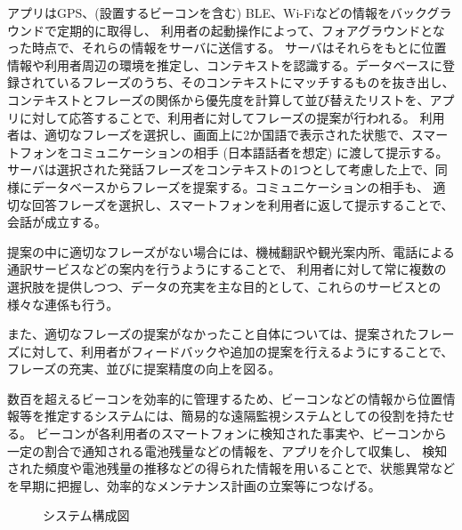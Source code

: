 \documentclass[openany,11pt,papersize]{jsbook}
\begin{document}
アプリはGPS、(設置するビーコンを含む) BLE、Wi-Fiなどの情報をバックグラウンドで定期的に取得し、
利用者の起動操作によって、フォアグラウンドとなった時点で、それらの情報をサーバに送信する。
サーバはそれらをもとに位置情報や利用者周辺の環境を推定し、コンテキストを認識する。データベースに登録されているフレーズのうち、そのコンテキストにマッチするものを抜き出し、
コンテキストとフレーズの関係から優先度を計算して並び替えたリストを、アプリに対して応答することで、利用者に対してフレーズの提案が行われる。
利用者は、適切なフレーズを選択し、画面上に2か国語で表示された状態で、スマートフォンをコミュニケーションの相手 (日本語話者を想定) に渡して提示する。
サーバは選択された発話フレーズをコンテキストの1つとして考慮した上で、同様にデータベースからフレーズを提案する。コミュニケーションの相手も、
適切な回答フレーズを選択し、スマートフォンを利用者に返して提示することで、会話が成立する。

提案の中に適切なフレーズがない場合には、機械翻訳や観光案内所、電話による通訳サービスなどの案内を行うようにすることで、
利用者に対して常に複数の選択肢を提供しつつ、データの充実を主な目的として、これらのサービスとの様々な連係も行う。

また、適切なフレーズの提案がなかったこと自体については、提案されたフレーズに対して、利用者がフィードバックや追加の提案を行えるようにすることで、
フレーズの充実、並びに提案精度の向上を図る。

数百を超えるビーコンを効率的に管理するため、ビーコンなどの情報から位置情報等を推定するシステムには、簡易的な遠隔監視システムとしての役割を持たせる。
ビーコンが各利用者のスマートフォンに検知された事実や、ビーコンから一定の割合で通知される電池残量などの情報を、アプリを介して収集し、
検知された頻度や電池残量の推移などの得られた情報を用いることで、状態異常などを早期に把握し、効率的なメンテナンス計画の立案等につなげる。
\begin{figure}[htbp]
 \begin{center}
 \end{center}
 \caption{システム構成図}
 \label{fig:system_structure}
\end{figure}
\end{document}
